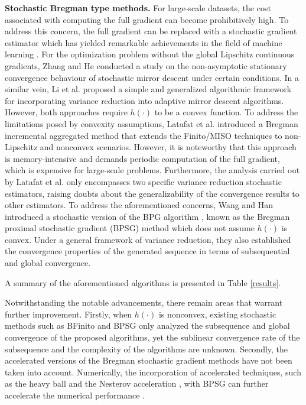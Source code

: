 \documentclass[letterpaper]{article} %
\begin{document}
	
	\textbf{Stochastic Bregman type methods.} For large-scale datasets, the cost associated with computing the full gradient can become prohibitively high.  To address this concern, the full gradient can be replaced with a stochastic gradient estimator \cite{RobbinsM1951, Bottou10} which has yielded remarkable achievements in the field of machine learning \cite{LinLF2020book, Lan2020First}. For the optimization problem without the global  Lipschitz continuous gradients, Zhang and He \cite{ZhangH18} conducted a study on the non-asymptotic stationary convergence behaviour of stochastic mirror descent under certain conditions.  In a similar vein, Li et al. \cite{LiWZC22} proposed a simple and generalized algorithmic framework for incorporating variance reduction into adaptive mirror descent algorithms. However, both approaches \cite{ZhangH18, LiWZC22} require $h(\cdot)$ to be a convex function. To address the limitations posed by convexity assumptions, Latafat et al. \cite{LatafatTAP22} introduced a  Bregman incremental aggregated method that extends the Finito/MISO techniques\cite{DefazioDC14, Mairal15} to non-Lipschitz and nonconvex scenarios. However, it is noteworthy that this approach is memory-intensive and demands periodic computation of the full gradient, which is expensive for large-scale problems. Furthermore, the analysis carried out by Latafat et al. \cite{LatafatTAP22} only encompasses two specific variance reduction stochastic estimators, raising doubts about the generalizability of the convergence results to other estimators. To address the aforementioned concerns,  Wang and Han \cite{WangH23} introduced a stochastic version of the BPG algorithm \cite{BolteSTV18First}, known as the Bregman proximal stochastic gradient (BPSG) method which does not assume $h(\cdot)$ is convex. Under a general framework of variance reduction, they also established the convergence properties of the generated sequence in terms of subsequential and global convergence. 
	
	A summary of the aforementioned algorithms is presented in Table \ref{results}. 
	
	Notwithstanding the notable advancements, there remain areas that warrant further improvement.  Firstly, 
	when $h(\cdot)$ is nonconvex, existing stochastic methods such as BFinito \cite{LatafatTAP22} and BPSG \cite{WangH23}   only analyzed the subsequence and global convergence of the proposed algorithms, yet the sublinear convergence rate of the subsequence and the complexity of the algorithms are unknown. 
	Secondly, the accelerated versions of the Bregman stochastic gradient methods  %
	have not been taken into account. 
	Numerically, the incorporation of accelerated techniques, such as the heavy ball \cite{Polyak64} and the Nesterov acceleration \cite{Nesterov1983}, with BPSG can further accelerate the numerical performance \cite{LinLF2020book}.
	
\end{document}
